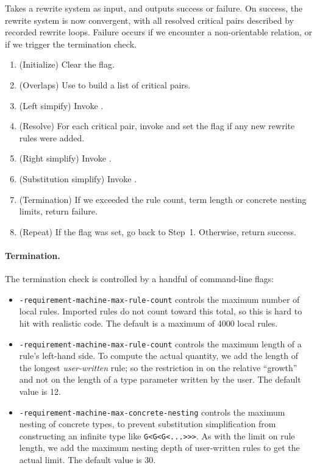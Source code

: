 \documentclass[../generics]{subfiles}
\begin{document}
\begin{algorithm}\label{knuthbendix} Takes a rewrite system as input, and outputs success or failure. On success, the rewrite system is now convergent, with all resolved critical pairs described by recorded rewrite loops. Failure occurs if we encounter a non-orientable relation, or if we trigger the termination check.
\begin{enumerate}
\item (Initialize) Clear the flag.
\item (Overlaps) Use  to build a list of critical pairs.
\item (Left simpify) Invoke .
\item (Resolve) For each critical pair, invoke  and set the flag if any new rewrite rules were added.
\item (Right simplify) Invoke .
\item (Substitution simplify) Invoke .
\item (Termination) If we exceeded the rule count, term length or concrete nesting limits, return failure.
\item (Repeat) If the flag was set, go back to Step~1. Otherwise, return success.
\end{enumerate}
\end{algorithm}

\paragraph{Termination.} The termination check is controlled by a handful of command-line flags:
\begin{itemize}
\item {} \texttt{-requirement-machine-max-rule-count} controls the maximum number of local rules. Imported rules do not count toward this total, so this is hard to hit with realistic code. The default is a maximum of 4000 local rules.

\item {} \texttt{-requirement-machine-max-rule-count} controls the maximum length of a rule's left-hand side. To compute the actual quantity, we add the length of the longest \emph{user-written} rule; so the restriction in on the relative ``growth'' and not on the length of a type parameter written by the user. The default value is 12.

\item {} \texttt{-requirement-machine-max-concrete-nesting} controls the maximum nesting of concrete types, to prevent substitution simplification from constructing an infinite type like \texttt{G<G<G<...>>>}. As with the limit on rule length, we add the maximum nesting depth of user-written rules to get the actual limit. The default value is 30.
\end{itemize}
\end{document}
